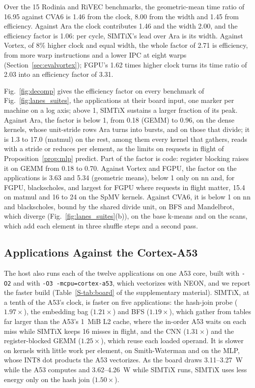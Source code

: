 \documentclass[journal]{IEEEtran}
\begin{document}
Over the 15 Rodinia and RiVEC benchmarks, the geometric-mean time ratio of 16.95
against CVA6 is 1.46 from the clock, 8.00 from the width and 1.45 from efficiency.
Against Ara the clock contributes 1.46 and the width 2.00, and the efficiency factor is
1.06: per cycle, SIMTiX's lead over Ara is its width. Against Vortex, of 8\% higher
clock and equal width, the whole factor of 2.71 is efficiency, from more warp
instructions and a lower IPC at eight warps (Section~\ref{sec:evalvortex}); FGPU's 1.62
times higher clock turns its time ratio of 2.03 into an efficiency factor of 3.31.

Fig.~\ref{fig:decomp} gives the efficiency factor on every benchmark of
Fig.~\ref{fig:lanes_suites}, the applications at their board input, one marker per
machine on a log axis; above 1, SIMTiX sustains a larger fraction of its peak. Against
Ara, the factor is below 1, from 0.18 (GEMM) to 0.96, on the dense kernels, whose
unit-stride rows Ara turns into bursts, and on those that divide; it is 1.3 to 17.0
(matmul) on the rest, among them every kernel that gathers, reads with a stride or
reduces per element, as the limits on requests in flight of
Proposition~\ref{prop:mlp} predict. Part of the factor is code: register blocking
raises it on GEMM from 0.18 to 0.70. Against Vortex and FGPU, the factor on the
applications is 3.63 and 5.34 (geometric means), below 1 only on nn and, for FGPU,
blackscholes, and largest for FGPU where requests in flight matter, 15.4 on matmul and
16 to 24 on the SpMV kernels. Against CVA6, it is below 1 on nn and blackscholes, bound
by the shared divide unit, on BFS and Mandelbrot, which diverge
(Fig.~\ref{fig:lanes_suites}(b)), on the base k-means and on the scans, which add each
element in three shuffle steps and a second pass.

\subsection{Applications Against the Cortex-A53}\label{sec:evalboard}
The host also runs each of the twelve applications on one A53 core, built with
\texttt{-O2} and with \texttt{-O3 -mcpu=cortex-a53}, which vectorizes with NEON, and we
report the faster build (Table~\ref{S-tab:board} of the supplementary material).
SIMTiX, at a tenth of the A53's clock, is faster on five applications: the hash-join
probe ($1.97\times$), the embedding bag ($1.21\times$) and BFS ($1.19\times$), which
gather from tables far larger than the A53's 1~MiB L2 cache, where the in-order A53
waits on each miss while SIMTiX keeps 16 misses in flight, and the CNN ($1.31\times$)
and the register-blocked GEMM ($1.25\times$), which reuse each loaded operand. It is
slower on kernels with little work per element, on Smith-Waterman and on the MLP, whose
INT8 dot products the A53 vectorizes. As the board draws 3.11--3.27~W while the A53
computes and 3.62--4.26~W while SIMTiX runs, SIMTiX uses less energy only on the hash
join ($1.50\times$).
\end{document}
